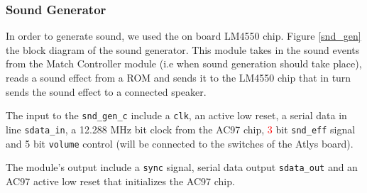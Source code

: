 		  \subsubsection{Sound Generator}
				In order to generate sound, we used the on board LM4550 chip. Figure \ref{snd_gen} the block diagram of the sound generator. This module takes in the sound events from the Match Controller module (i.e when sound generation should take place), reads a sound effect from a ROM and sends it to the LM4550 chip that in turn sends the sound effect to a connected speaker.
				
				The input to the \texttt{snd\_gen\_c} include a \texttt{clk}, an active low reset, a serial data in line \texttt{sdata\_in}, a 12.288 MHz bit clock from the AC97 chip, \textcolor{red}{3} bit \texttt{snd\_eff} signal and 5 bit \texttt{volume} control (will be connected to the switches of the Atlys board).
				
				The module's output include a \texttt{sync} signal, serial data output \texttt{sdata\_out} and an AC97 active low reset that initializes the AC97 chip. 
				
